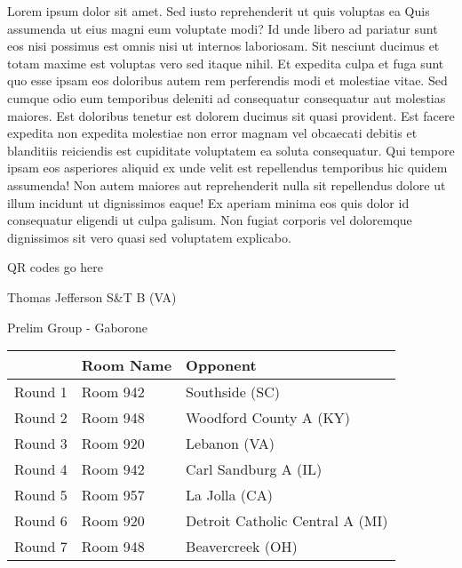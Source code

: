 \documentclass{article}%
\begin{document}
\vspace*{8pt}%
\linebreak%
\newline%
\newline%
Lorem ipsum dolor sit amet. Sed iusto reprehenderit ut quis voluptas ea Quis assumenda ut eius magni eum voluptate modi? Id unde libero ad pariatur sunt eos nisi possimus est omnis nisi ut internos laboriosam. Sit nesciunt ducimus et totam maxime est voluptas vero sed itaque nihil. Et expedita culpa et fuga sunt quo esse ipsam eos doloribus autem rem perferendis modi et molestiae vitae.\newline%
\newline%
Sed cumque odio eum temporibus deleniti ad consequatur consequatur aut molestias maiores. Est doloribus tenetur est dolorem ducimus sit quasi provident. Est facere expedita non expedita molestiae non error magnam vel obcaecati debitis et blanditiis reiciendis est cupiditate voluptatem ea soluta consequatur. Qui tempore ipsam eos asperiores aliquid ex unde velit est repellendus temporibus hic quidem assumenda!\newline%
\newline%
Non autem maiores aut reprehenderit nulla sit repellendus dolore ut illum incidunt ut dignissimos eaque! Ex aperiam minima eos quis dolor id consequatur eligendi ut culpa galisum. Non fugiat corporis vel doloremque dignissimos sit vero quasi sed voluptatem explicabo.\newline%
\newline%
%
\vspace*{30pt}%
\begin{center}%
\begin{Huge}%
QR codes go here%
\end{Huge}%
\end{center}%
\newpage%
%
\begin{center}%
\begin{Huge}%
Thomas Jefferson S\&T B (VA)%
\end{Huge}%
\vspace*{8pt}%
\linebreak%
\begin{Large}%
Prelim Group {-} Gaborone%
\end{Large}%
\end{center}%
\begin{tabularx}{\textwidth}{|c|Y|Y|}%
\hline%
&Room Name&Opponent\\%
\hline%
Round 1&Room 942&Southside (SC)\\%
Round 2&Room 948&Woodford County A (KY)\\%
Round 3&Room 920&Lebanon (VA)\\%
Round 4&Room 942&Carl Sandburg A (IL)\\%
Round 5&Room 957&La Jolla (CA)\\%
Round 6&Room 920&Detroit Catholic Central A (MI)\\%
Round 7&Room 948&Beavercreek (OH)\\%
\hline%
\end{tabularx}%
\end{document}
